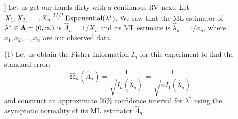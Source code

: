 \begin{example}[[Fisher Information of the $\exponential$ Experiment]]\label{EX:ExponentialFisherInfo}
Let us get our hands dirty with a continuous RV next.  Let $X_1,X_2,\ldots,X_n \overset{IID}{\sim} \mbox{{\rm Exponential}}(\lambda^*)$.  We saw that the ML estimator of $\lambda^* \in {\Lambda}\mspace{-11 mu}{\Lambda}=(0,\infty)$ is $\widehat{\Lambda}_n = 1/\overline{X}_n$ and its ML estimate is $\widehat{\lambda}_n=1/\overline{x}_n$, where $x_1,x_2,\ldots,x_n$ are our observed data.

(1) Let us obtain the Fisher Information $I_n$ for this experiment to find the standard error:
\[
\widehat{\mathsf{se}}_n(\widehat{\Lambda}_n) = \frac{1}{\sqrt{I_n(\widehat{\lambda}_n)}}
= \frac{1}{\sqrt{n I_1(\widehat{\lambda}_n)}}
\]
and construct an approximate $95\%$ confidence interval for $\lambda^*$ using the asymptotic normality of its ML estimator $\widehat{\Lambda}_n$.  


\end{example}
